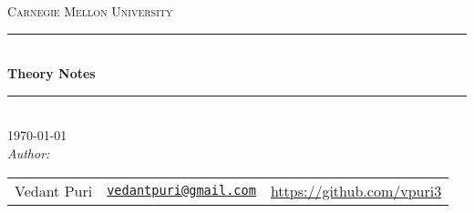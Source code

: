 %
\newcommand{\HRule}{\rule{\linewidth}{0.5mm}}
\center
\textsc{\LARGE Carnegie Mellon University}\\[1cm]
\HRule \\[0.4cm]

{
  \huge \bfseries Theory Notes \\[0.5cm]
}

\HRule \\[1cm]
{\Large \today}\\[1cm]
\emph{Author:}\\
\begin{tabular}{l r l}
  Vedant Puri         & \href{mailto:vedantpuri@gmail.com}{\texttt{vedantpuri@gmail.com}}  &  \url{https://github.com/vpuri3} \\
\end{tabular}\\[0.5cm]

\vfill